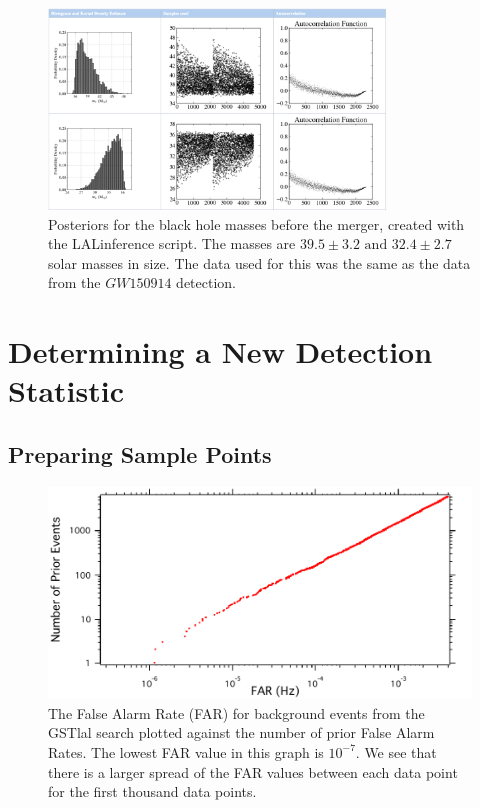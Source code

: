 \documentclass{article}
\begin{document}
    \begin{figure}[h!]
    	\centering
    	\includegraphics[width=0.8\textwidth]{Figures/LALinferenceMasses.png} 
    	\caption{Posteriors for the black hole masses before the merger, created with the LALinference script. The masses are $39.5\pm3.2 \text{ and } 32.4\pm2.7$ solar masses in size. The data used for this was the same as the data from the $GW150914$ detection.}
    	\label{Fig:LALinferenceMasses}
    \end{figure}
 
 \newpage
 \section{Determining a New Detection Statistic}
 
 
 
 
 
 \subsection{Preparing Sample Points}
 
 
   \begin{figure}[h]
   	\centering
   	\includegraphics[width=1\textwidth]{Figures/FAP_Count.pdf} 
   	\caption{The False Alarm Rate (FAR) for background events from the GSTlal search plotted against the number of prior False Alarm Rates. The lowest FAR value in this graph is $10^{-7}$. We see that there is a larger spread of the FAR values between each data point for the first thousand data points.}
   	\label{Fig:FAR_Count}
   \end{figure}
   
\end{document}
